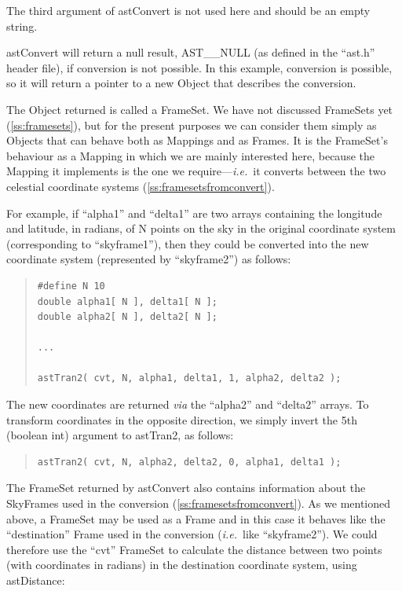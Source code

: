 \documentclass[twoside,11pt]{article}
\newcommand{\htmlref}[2]{#1}
\newcommand{\secref}[1]{\S\ref{#1}}
\renewcommand{\secref}[1]{\ref{#1}}
\begin{document}
The third argument of astConvert is not used here and should be an
empty string.

astConvert will return a null result, AST\_\_NULL (as defined in the
``ast.h'' header file), if conversion is not possible. In this
example, conversion is possible, so it will return a pointer to a new
\htmlref{Object}{Object} that describes the conversion.

The Object returned is called a \htmlref{FrameSet}{FrameSet}. We have not discussed
FrameSets yet (\secref{ss:framesets}), but for the present purposes we
can consider them simply as Objects that can behave both as Mappings
and as Frames. It is the FrameSet's behaviour as a \htmlref{Mapping}{Mapping} in which we
are mainly interested here, because the Mapping it implements is the
one we require---{\em{i.e.}}\ it converts between the two celestial
coordinate systems (\secref{ss:framesetsfromconvert}).

For example, if ``alpha1'' and ``delta1'' are two arrays containing
the longitude and latitude, in radians, of N points on the sky in the
original coordinate system (corresponding to ``skyframe1''), then they
could be converted into the new coordinate system (represented by
``skyframe2'') as follows:

\begin{quote}
\small
\begin{verbatim}
#define N 10
double alpha1[ N ], delta1[ N ];
double alpha2[ N ], delta2[ N ];

...

astTran2( cvt, N, alpha1, delta1, 1, alpha2, delta2 );
\end{verbatim}
\normalsize
\end{quote}

The new coordinates are returned {\em{via}} the ``alpha2'' and
``delta2'' arrays.  To transform coordinates in the opposite
direction, we simply invert the 5th (boolean int) argument to
\htmlref{astTran2}{astTran2}, as follows:

\begin{quote}
\small
\begin{verbatim}
astTran2( cvt, N, alpha2, delta2, 0, alpha1, delta1 );
\end{verbatim}
\normalsize
\end{quote}

The FrameSet returned by astConvert also contains information about
the SkyFrames used in the conversion
(\secref{ss:framesetsfromconvert}). As we mentioned above, a FrameSet
may be used as a \htmlref{Frame}{Frame} and in this case it behaves like the
``destination'' Frame used in the conversion ({\em{i.e.}}\ like
``skyframe2'').  We could therefore use the ``cvt'' FrameSet to
calculate the distance between two points (with coordinates in
radians) in the destination coordinate system, using \htmlref{astDistance}{astDistance}:
\end{document}
